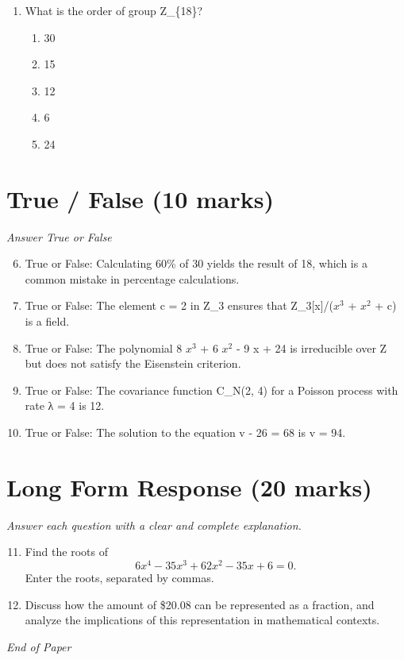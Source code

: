 \documentclass[12pt]{article}
\begin{document}
\begin{enumerate}[label=\arabic*.]
\begin{enumerate}[label=(\alph*)]
    \item 42
    \item 30
    \item -42
    \item -36
    \item 1 over 216
\end{enumerate}
\item What is the order of group Z\_\{18\}?
\begin{enumerate}[label=(\alph*)]
    \item 30
    \item 15
    \item 12
    \item 6
    \item 24
\end{enumerate}
\end{enumerate}

\section*{True / False (10 marks)}
\textit{Answer True or False}
\begin{enumerate}[label=\arabic*.]
\setcounter{enumi}{5}
\item True or False: Calculating 60\% of 30 yields the result of 18, which is a common mistake in percentage calculations.
\item True or False: The element c = 2 in Z\_3 ensures that Z\_3[x]/($x^3$ + $x^2$ + c) is a field.
\item True or False: The polynomial 8 $x^3$ + 6 $x^2$ - 9 x + 24 is irreducible over Z but does not satisfy the Eisenstein criterion.
\item True or False: The covariance function C\_N(2, 4) for a Poisson process with rate λ = 4 is 12.
\item True or False: The solution to the equation v - 26 = 68 is v = 94.
\end{enumerate}

\section*{Long Form Response (20 marks)}
\textit{Answer each question with a clear and complete explanation.}
\begin{enumerate}[label=\arabic*.]
\setcounter{enumi}{10}
\item Find the roots of \[6 x^4 - 35 x^3 + 62 x^2 - 35 x + 6 = 0.\]Enter the roots, separated by commas.
\item Discuss how the amount of \$20.08 can be represented as a fraction, and analyze the implications of this representation in mathematical contexts.
\end{enumerate}

\vfill
\noindent\textit{End of Paper}
\end{document}
